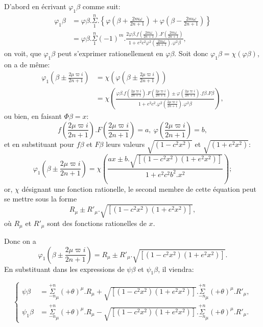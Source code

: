 \documentclass{article}
\begin{document}
D'abord en écrivant $\varphi_{1}\beta$ comme suit:
\[ \begin{aligned}
\varphi_{1}\beta&=\varphi\beta.\overset{n}{\underset{1}{\Sigma}}.\left\{\varphi\left(\beta+\frac{2m\omega}{2n+1}\right)+\varphi\left(\beta-\frac{2m\omega}{2n+1}\right)\right\}\\
&=\varphi\beta.\overset{n}{\underset{1}{\Sigma}}(-1)^{m}.\frac{2\varphi\beta.f\left(\frac{2m\omega}{2n+1}\right).F\left(\frac{2m\omega}{2n+1}\right)}{1+e^{2}c^{2}\varphi^{2}\left(\frac{2m\omega}{2n+1}\right).\varphi^{2}\beta},
\end{aligned} \]
on voit, que $\varphi_{1}\beta$ peut s'exprimer rationellement en $\varphi\beta$. Soit donc $\varphi_{1}\beta=\chi(\varphi\beta)$, on a de même:
\[ \begin{aligned}
\varphi_{1}\left(\beta\pm\frac{2\mu\varpi i}{2n+1}\right)&=\chi\left(\varphi\left(\beta\pm\frac{2\mu\varpi i}{2n+1}\right)\right)\\
&=\chi\left(\frac{\varphi\beta.f\left(\frac{2\mu\varpi i}{2n+1}\right).F\left(\frac{2\mu\varpi i}{2n+1}\right)\pm\varphi\left(\frac{2\mu\varpi i}{2n+1}\right).f\beta.F\beta}{1+e^{2}c^{2}.\varphi^{2}\left(\frac{2\mu\varpi i}{2n+1}\right).\varphi^{2}\beta}\right),
\end{aligned} \]
ou bien, en faisant $\Phi\beta=x$:
\[ f\left(\frac{2\mu\varpi i}{2n+1}\right).F\left(\frac{2\mu\varpi i}{2n+1}\right)=a,\ \varphi\left(\frac{2\mu\varpi i}{2n+1}\right)=b, \]
et en substituant pour $f\beta$ et $F\beta$ leurs valeurs $\sqrt{(1-c^{2}x^{2})}$ et $\sqrt{(1+e^{2}x^{2})}$:
\[ \varphi_{1}\left(\beta\pm\frac{2\mu\varpi i}{2n+1}\right)=\chi\left(\frac{ax\pm b.\sqrt{[(1-c^{2}x^{2})(1+e^{2}x^{2})]}}{1+e^{2}c^{2}b^{2}.x^{2}}\right); \]
or, $\chi$ désignant une fonction rationelle, le second membre de cette équation peut se mettre sous la forme
\[ R_{\mu}\pm R'_{\mu}.\sqrt{[(1-c^{2}x^{2})(1+e^{2}x^{2})]}, \]
où $R_{\mu}$ et $R'_{\mu}$ sont des fonctions rationelles de $x$.

Donc on a
\[ \varphi_{1}\left(\beta\pm\frac{2\mu\varpi i}{2n+1}\right)=R_{\mu}\pm R'_{\mu}.\sqrt{[(1-c^{2}x^{2})(1+e^{2}x^{2})]}. \]
En substituant dans les expressions de $\psi\beta$ et $\psi_{1}\beta$, il viendra:

\[ \left\{\begin{aligned}
\psi\beta&=\overset{+n}{\underset{-n}{\Sigma}}_{\mu}(+\theta)^{\mu}.R_{\mu}+\sqrt{[(1-c^{2}x^{2})(1+e^{2}x^{2})]}.\overset{+n}{\underset{-n}{\Sigma}}_{\mu}(+\theta)^{\mu}.R'_{\mu},\\
\psi_{1}\beta&=\overset{+n}{\underset{-n}{\Sigma}}_{\mu}(+\theta)^{\mu}.R_{\mu}-\sqrt{[(1-c^{2}x^{2})(1+e^{2}x^{2})]}.\overset{+n}{\underset{-n}{\Sigma}}_{\mu}(+\theta)^{\mu}.R'_{\mu}.
\end{aligned}\right. \tag{70.} \]
\end{document}
